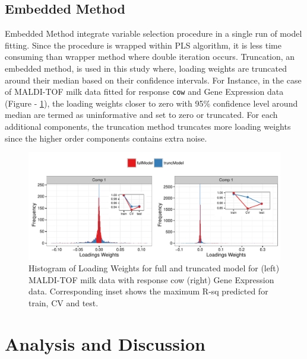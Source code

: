 \documentclass[10pt, a4paper]{article}\usepackage[]{graphicx}\usepackage[]{color}
\makeatletter
\def\maxwidth{ %
  \ifdim\Gin@nat@width>\linewidth
    \linewidth
  \else
    \Gin@nat@width
  \fi
}
\newenvironment{knitrout}{}{} %
\makeatother
\begin{document}
\subsection{Embedded Method}

Embedded Method integrate variable selection procedure in a single run of model fitting. Since the procedure is wrapped within PLS algorithm, it is less time consuming than wrapper method where double iteration occurs. Truncation, an embedded method, is used in this study where, loading weights are truncated around their median based on their confidence intervals. For Instance, in the case of MALDI-TOF milk data fitted for response \texttt{cow} and Gene Expression data (Figure - \ref{fig:truncPlot}), the loading weights closer to zero with 95\% confidence level around median are termed as uninformative and set to zero or truncated. For each additional components, the truncation method truncates more loading weights since the higher order components contains extra noise.

\begin{knitrout}\small
{}\color{fgcolor}\begin{figure}[H]
\includegraphics[width=\maxwidth]{figure/truncPlot-1} \caption[Histogram of Loading Weights for full and truncated model for (left) MALDI-TOF milk data with response cow (right) Gene Expression data]{Histogram of Loading Weights for full and truncated model for (left) MALDI-TOF milk data with response cow (right) Gene Expression data. Corresponding inset shows the maximum R-sq predicted for train, CV and test.}\label{fig:truncPlot}
\end{figure}


\end{knitrout}



\section{Analysis and Discussion}
\end{document}
